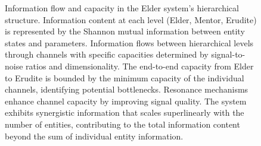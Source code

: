 \begin{figure}[t]
\begin{tikzpicture}[scale=0.8, transform shape]
\end{tikzpicture}
\caption{Information flow and capacity in the Elder system's hierarchical structure. Information content at each level (Elder, Mentor, Erudite) is represented by the Shannon mutual information between entity states and parameters. Information flows between hierarchical levels through channels with specific capacities determined by signal-to-noise ratios and dimensionality. The end-to-end capacity from Elder to Erudite is bounded by the minimum capacity of the individual channels, identifying potential bottlenecks. Resonance mechanisms enhance channel capacity by improving signal quality. The system exhibits synergistic information that scales superlinearly with the number of entities, contributing to the total information content beyond the sum of individual entity information.}
\label{fig:hierarchical_information}
\end{figure}